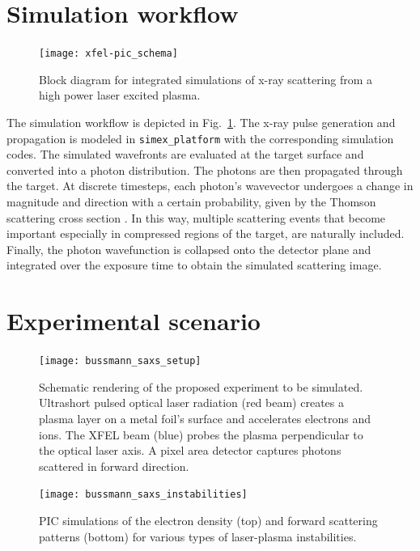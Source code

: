 \documentclass[12pt]{scrartcl}
\begin{document}
\section{Simulation workflow}
%
\begin{figure}[ht]
  \begin{center}
    \texttt{[image: xfel-pic\_schema]}
  \end{center}
  \caption{Block diagram for integrated simulations of x-ray scattering from a high
  power laser excited plasma.}
  \label{fig:xfel-pic_schema}
\end{figure}

The simulation workflow is depicted in Fig.~\ref{fig:xfel-pic_schema}. The x-ray
pulse generation and propagation is modeled in \texttt{simex\_platform} with the
corresponding simulation codes. The simulated wavefronts are evaluated at the
target surface and converted into a photon distribution. The photons are then
propagated through the target. At discrete timesteps, each photon's wavevector
undergoes a change in magnitude and direction  with a
certain probability, given by the Thomson scattering cross section
\cite{Jackson1975}. In this way, multiple scattering events that become
important especially in compressed regions of the target, are naturally
included. Finally, the photon wavefunction is collapsed onto the detector plane
and integrated over the exposure time to obtain the simulated scattering image.
%
%
\section{Experimental scenario}
%
\begin{figure}[ht]
  \begin{center}
    \texttt{[image: bussmann\_saxs\_setup]}
  \end{center}
  \caption{Schematic rendering of the proposed experiment to be simulated.
  Ultrashort pulsed optical laser radiation (red beam) creates a plasma layer on
a metal foil's surface and accelerates electrons and ions. The XFEL beam (blue)
probes the plasma perpendicular to the optical laser axis. A pixel area detector
captures photons scattered in forward direction.}
  \label{fig:xfel-saxs_setup}
\end{figure}
%
\begin{figure}[ht]
  \begin{center}
    \texttt{[image: bussmann\_saxs\_instabilities]}
  \end{center}
  \caption{PIC simulations of the electron density (top) and forward scattering
    patterns (bottom) for various
  types of laser-plasma instabilities.}
  \label{fig:saxs_instabilities}
\end{figure}
\end{document}
